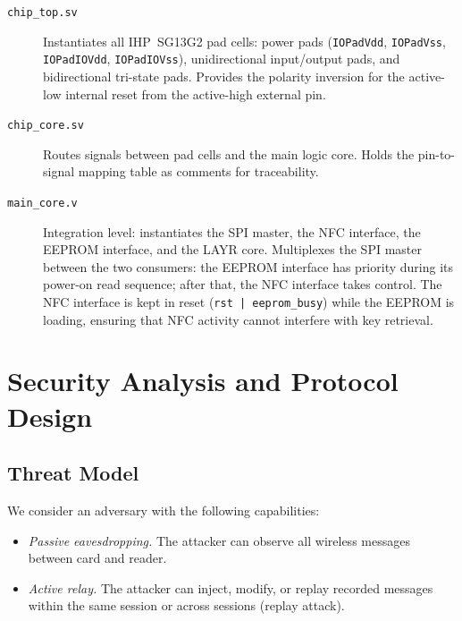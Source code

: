\documentclass[manuscript,screen,nonacm]{acmart}
\begin{document}
\begin{description}
  \item[\texttt{chip\_top.sv}]
    Instantiates all IHP~SG13G2 pad cells: power pads (\texttt{IOPadVdd},
    \texttt{IOPadVss}, \texttt{IOPadIOVdd}, \texttt{IOPadIOVss}),
    unidirectional input/output pads, and bidirectional tri-state pads.
    Provides the polarity inversion for the active-low internal reset
    from the active-high external pin.

  \item[\texttt{chip\_core.sv}]
    Routes signals between pad cells and the main logic core.
    Holds the pin-to-signal mapping table as comments for
    traceability.

  \item[\texttt{main\_core.v}]
    Integration level: instantiates the SPI master, the NFC interface,
    the EEPROM interface, and the LAYR core.
    Multiplexes the SPI master between the two consumers: the EEPROM
    interface has priority during its power-on read sequence; after
    that, the NFC interface takes control.
    The NFC interface is kept in reset (\texttt{rst | eeprom\_busy})
    while the EEPROM is loading, ensuring that NFC activity cannot
    interfere with key retrieval.
\end{description}

\section{Security Analysis and Protocol Design}
\label{sec:security}

\subsection{Threat Model}
\label{sec:security:threat}

We consider an adversary with the following capabilities:

\begin{itemize}
  \item \emph{Passive eavesdropping.} The attacker can observe all
        wireless messages between card and reader.
  \item \emph{Active relay.} The attacker can inject, modify, or replay
        recorded messages within the same session or across sessions
        (replay attack).
\end{itemize}
\end{document}
